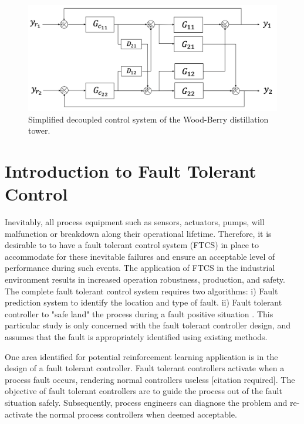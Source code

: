 \begin{figure}[h]
    \centering
    \includegraphics[scale=0.39]{images/decoupled_pid_loop_iol.png}
    \caption{Simplified decoupled control system of the Wood-Berry distillation tower.}
    \label{fig: decoupled_control_loop_IOL}
\end{figure}

\section{Introduction to Fault Tolerant Control}

Inevitably, all process equipment such as sensors, actuators, pumps, will malfunction or breakdown along their operational lifetime. Therefore, it is desirable to to have a fault tolerant control system (FTCS) in place to accommodate for these inevitable failures and ensure an acceptable level of performance during such events. The application of FTCS in the industrial environment results in increased operation robustness, production, and safety. The complete fault tolerant control system requires two algorithms: i) Fault prediction system to identify the location and type of fault. ii) Fault tolerant controller to "safe land" the process during a fault positive situation \cite{process_faults}.  This particular study is only concerned with the fault tolerant controller design, and assumes that the fault is appropriately identified using existing methods.

One area identified for potential reinforcement learning application is in the design of a fault tolerant controller.  Fault tolerant controllers activate when a process fault occurs, rendering normal controllers useless [citation required]. The objective of fault tolerant controllers are to guide the process out of the fault situation safely.  Subsequently, process engineers can diagnose the problem and re-activate the normal process controllers when deemed acceptable.  

